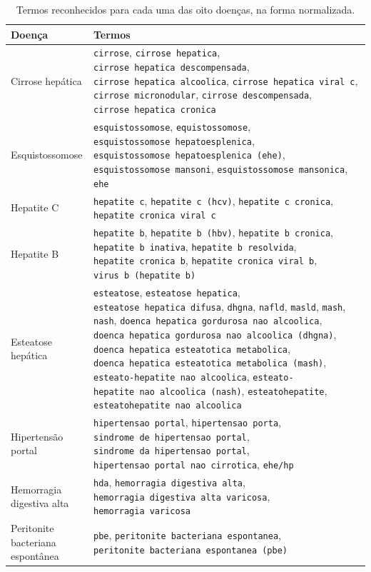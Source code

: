 \begin{table}[H]
\centering
\caption[Termos reconhecidos para cada doença]{Termos reconhecidos para cada uma das oito doenças, na forma normalizada.}
\label{tab:ap-termos}
\small
\renewcommand{\arraystretch}{1.25}
\begin{tabular}{@{}>{\raggedright\arraybackslash}p{3.4cm}p{11.2cm}@{}}
\toprule
Doença & Termos \\
\midrule
Cirrose hepática & \raggedright \texttt{cirrose}, \texttt{cirrose\ hepatica}, \texttt{cirrose\ hepatica\ descompensada}, \texttt{cirrose\ hepatica\ alcoolica}, \texttt{cirrose\ hepatica\ viral\ c}, \texttt{cirrose\ micronodular}, \texttt{cirrose\ descompensada}, \texttt{cirrose\ hepatica\ cronica} \tabularnewline
Esquistossomose & \raggedright \texttt{esquistossomose}, \texttt{equistossomose}, \texttt{esquistossomose\ hepatoesplenica}, \texttt{esquistossomose\ hepatoesplenica\ (ehe)}, \texttt{esquistossomose\ mansoni}, \texttt{esquistossomose\ mansonica}, \texttt{ehe} \tabularnewline
Hepatite C & \raggedright \texttt{hepatite\ c}, \texttt{hepatite\ c\ (hcv)}, \texttt{hepatite\ c\ cronica}, \texttt{hepatite\ cronica\ viral\ c} \tabularnewline
Hepatite B & \raggedright \texttt{hepatite\ b}, \texttt{hepatite\ b\ (hbv)}, \texttt{hepatite\ b\ cronica}, \texttt{hepatite\ b\ inativa}, \texttt{hepatite\ b\ resolvida}, \texttt{hepatite\ cronica\ b}, \texttt{hepatite\ cronica\ viral\ b}, \texttt{virus\ b\ (hepatite\ b)} \tabularnewline
Esteatose hepática & \raggedright \texttt{esteatose}, \texttt{esteatose\ hepatica}, \texttt{esteatose\ hepatica\ difusa}, \texttt{dhgna}, \texttt{nafld}, \texttt{masld}, \texttt{mash}, \texttt{nash}, \texttt{doenca\ hepatica\ gordurosa\ nao\ alcoolica}, \texttt{doenca\ hepatica\ gordurosa\ nao\ alcoolica\ (dhgna)}, \texttt{doenca\ hepatica\ esteatotica\ metabolica}, \texttt{doenca\ hepatica\ esteatotica\ metabolica\ (mash)}, \texttt{esteato-hepatite\ nao\ alcoolica}, \texttt{esteato-hepatite\ nao\ alcoolica\ (nash)}, \texttt{esteatohepatite}, \texttt{esteatohepatite\ nao\ alcoolica} \tabularnewline
Hipertensão portal & \raggedright \texttt{hipertensao\ portal}, \texttt{hipertensao\ porta}, \texttt{sindrome\ de\ hipertensao\ portal}, \texttt{sindrome\ da\ hipertensao\ portal}, \texttt{hipertensao\ portal\ nao\ cirrotica}, \texttt{ehe/hp} \tabularnewline
Hemorragia digestiva alta & \raggedright \texttt{hda}, \texttt{hemorragia\ digestiva\ alta}, \texttt{hemorragia\ digestiva\ alta\ varicosa}, \texttt{hemorragia\ varicosa} \tabularnewline
Peritonite bacteriana espontânea & \raggedright \texttt{pbe}, \texttt{peritonite\ bacteriana\ espontanea}, \texttt{peritonite\ bacteriana\ espontanea\ (pbe)} \tabularnewline
\bottomrule
\end{tabular}
\par{}
\end{table}
